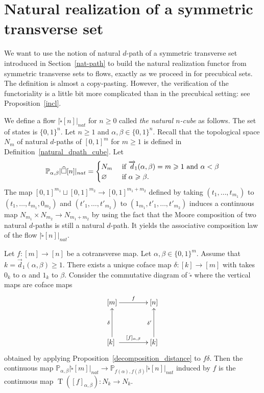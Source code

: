 \documentclass[a4paper,12pt]{amsart}
\makeatletter
\newcommand{\p}{\times}
\renewcommand{\vec}{\overrightarrow}
\theoremstyle{definition}
\newcommand{\fr}[1]{\ar@{->}[r]^-{#1}}
\newcommand{\fu}[1]{\ar@{->}[u]^-{#1}}
\renewcommand{\geq}{\geqslant}
\renewcommand{\P}{\mathbb{P}}
\newcommand{\vd}{\vec{d}\!_1}
\DeclareMathOperator{\TT}{T}
\makeatother
\begin{document}
\section{Natural realization of a symmetric transverse set}
\label{concl}

We want to use the notion of natural $d$-path of a symmetric transverse set introduced in Section~\ref{nat-path} to build the natural realization functor from symmetric transverse sets to flows, exactly as we proceed in \cite[Section~5]{NaturalRealization} for precubical sets. The definition is almost a copy-pasting. However, the verification of the functoriality is a little bit more complicated than in the precubical setting: see Proposition~\ref{incl}.

We define a flow $|\widehat{\square}[n]|_{nat}$ for $n\geq 0$ called \textit{the natural $n$-cube} as follows. The set of states is $\{0,1\}^n$. Let $n\geq 1$ and $\alpha,\beta\in\{0,1\}^n$. Recall that the topological space $N_m$ of natural $d$-paths of $[0,1]^m$ for $m\geq 1$ is defined in Definition~\ref{natural_dpath_cube}. Let
\[
\P_{\alpha,\beta}|\widehat{\square}[n]|_{nat} = \begin{cases}
	N_m & \hbox{ if }\vd(\alpha,\beta) = m\geq 1 \hbox{ and }\alpha<\beta\\
	\varnothing & \hbox{ if }\alpha\geq \beta.
\end{cases}
\]
The map $[0,1]^{m_1}\sqcup [0,1]^{m_2} \to [0,1]^{m_1+m_2}$ defined by taking $(t_1,\dots,t_{m_1})$ to $(t_1,\dots,t_{m_1},0_{m_2})$ and $(t'_1,\dots,t'_{m_2})$ to $(1_{m_1},t'_1,\dots,t'_{m_2})$ induces a continuous map $N_{m_1}\p N_{m_2}\to N_{m_1+m_2}$ by using the fact that the Moore composition of two natural $d$-paths is still a natural $d$-path. It yields the associative composition law of the flow $|\widehat{\square}[n]|_{nat}$.

Let $f:[m]\to [n]$ be a cotransverse map. Let $\alpha,\beta\in\{0,1\}^m$. Assume that $k=\vd(\alpha,\beta) \geq 1$.  There exists a unique coface map $\delta:[k]\to [m]$ with takes $0_k$ to $\alpha$ and $1_k$ to $\beta$. Consider the commutative diagram of $\widehat{\square}$ where the vertical maps are coface maps 
\[
\xymatrix@C=4em@R=4em
{
[m] \fr{f} & [n]\\
[k] \fu{\delta} \fr{[f]_{\alpha,\beta}} & [k]\fu{\delta'}
}
\]
obtained by applying Proposition~\ref{decomposition_distance} to $f\delta$. Then the continuous map $\P_{\alpha,\beta}|\widehat{\square}[m]|_{nat}\to \P_{f(\alpha),f(\beta)}|\widehat{\square}[n]|_{nat}$ induced by $f$ is the continuous map $\TT([f]_{\alpha,\beta}):N_k\to N_k$.
\end{document}

